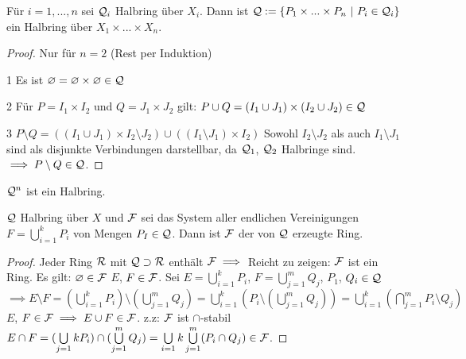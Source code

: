 \documentclass[11pt,a4paper,fleqn,openany]{report}
\begin{document}
    \begin{theorem}[i.A. II.20]
      Für $i = 1, ..., n$ sei $\mathcal{Q}_i$ Halbring über $X_i$. Dann ist $\mathcal{Q}:=\{P_1 \times ... \times P_n \ | \ P_i \in \mathcal{Q}_i\}$ ein Halbring über $X_1 \times ... \times X_n$.
    \end{theorem}

    \begin{proof}
	Nur für $n = 2$ (Rest per Induktion) \newline
	\item[1] Es ist $\varnothing = \varnothing\times\varnothing\in\mathcal{Q}$
	\item[2] Für $P=I_1\times I_2$ und $Q = J_1 \times J_2$ gilt: $ P\cup Q = (I_1 \cup J_1) \times (I_2 \cup J_2) \in \mathcal{Q}$
	\item[3] $P\setminus Q = ((I_1 \cup J_1)\times I_2\setminus J_2) \cup ((I_1\setminus J_1)\times I_2)$ \newline
	Sowohl $I_2\setminus J_2$ als auch $I_1 \setminus J_1$ sind als disjunkte Verbindungen darstellbar, da $\mathcal{Q}_1$, $\mathcal{Q}_2$ Halbringe sind. $\implies P\setminus Q \in \mathcal{Q}$.
   \end{proof}

    \begin{theorem}[i.A. II.21]
      $\mathcal{Q}^n$ ist ein Halbring.
    \end{theorem}


    \begin{theorem}[i.A. II.22]
      $\mathcal{Q}$ Halbring über $X$ und $\mathcal{F}$ sei das System aller endlichen Vereinigungen $F=\bigcup\limits_{i=1}^k P_i$ von Mengen $P_I \in \mathcal{Q}$. Dann ist $\mathcal{F}$ der von $\mathcal{Q}$ erzeugte Ring.
    \end{theorem}

    \begin{proof}
      Jeder Ring $\mathcal{R}$ mit $\mathcal{Q}\supset \mathcal{R}$ enthält $\mathcal{F} \implies$ Reicht zu zeigen: $\mathcal{F}$ ist ein Ring. \newline
      Es gilt: $\varnothing \in \mathcal{F}$ \newline
      $E$, $F \in \mathcal{F}$. Sei $E = \bigcup\limits_{i=1}^{k}P_i$, $F = \bigcup\limits_{j=1}^{m}Q_j$, $P_1$, $Q_i \in \mathcal{Q}$ \newline 
      $\implies E\setminus F = (\bigcup\limits_{i=1}^{k}P_i)\setminus (\bigcup\limits_{j=1}^{m}Q_j) = \bigcup\limits_{i=1}^{k}(P_i\setminus (\bigcup\limits_{j=1}^{m}Q_j)) = \bigcup\limits_{i=1}^{k}(\bigcap\limits_{j=1}^{m}P_i\setminus Q_j)$ \newline
      $E$, $F \in \mathcal{F} \implies E\cup F \in \mathcal{F}$. \newline
      z.z: $\mathcal{F}$ ist $\cap$-stabil \newline
      $E\cap F = (\bigcup\limits_{j=1}{k}P_i)\cap (\bigcup\limits_{j=1}^{m}Q_j) = \bigcup\limits_{i=1}{k} \bigcup\limits_{j=1}^{m}(P_i \cap Q_j) \in \mathcal{F}$. 
    \end{proof}
\end{document}
